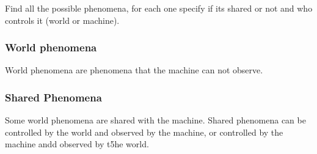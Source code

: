 Find all the possible phenomena, for each one specify if its shared or not and who controls it (world or machine). 

\subsubsection{World phenomena}
\label{subsubsect:worldphenomena}

World phenomena are phenomena that the machine can not observe.

\subsubsection{Shared Phenomena}
\label{subsubsect:sharedphenomena}

Some world phenomena are shared with the machine.
Shared phenomena can be controlled by the world and observed by the machine, or controlled by the machine andd observed by t5he world.
